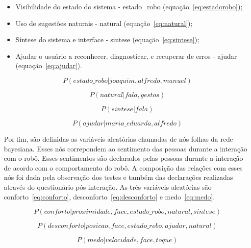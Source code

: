 \begin{itemize}
	\item Visibilidade do estado do sistema - estado\_robo (equação~\ref{eq:estadorobo});
	\item Uso de sugestões naturais - natural (equação~\ref{eq:natural});
	\item Síntese do sistema e interface - sintese (equação~\ref{eq:sintese});
	\item Ajudar o usuário a reconhecer, diagnosticar, e recuperar de erros - ajudar (equação~\ref{eq:ajudar}).
\end{itemize}

\begin{equation}
	\label{eq:estadorobo}
	P(estado\_robo | joaquim, alfredo, manuel)
\end{equation}

\begin{equation}
	\label{eq:natural}
	P(natural | fala, gestos)
\end{equation}

\begin{equation}
	\label{eq:sintese}
	P(sintese | fala)
\end{equation}

\begin{equation}
	\label{eq:ajudar}
	P(ajudar | maria\_eduarda, alfredo)
\end{equation}

Por fim, são definidas as variáveis aleatórias chamadas de nós folhas da rede bayesiana. Esses nós correpondem ao sentimento das pessoas durante a interação com o robô. Esses sentimentos são declarados pelas pessoas durante a interação de acordo com o comportamento do robô. A composição das relações com esses nós foi dada pela observação dos testes e também das declarações realizadas através do questionário pós interação. As três variáveis aleatórias são conforto~\ref{eq:conforto}, desconforto~\ref{eq:desconforto} e medo~\ref{eq:medo}.

\begin{equation}
	\label{eq:conforto}
	P(conforto | proximidade, face, estado\_robo, natural, sintese)
\end{equation}

\begin{equation}
	\label{eq:desconforto}
	P(desconforto | posicao, face, estado\_robo, ajudar, natural)
\end{equation}

\begin{equation}
	\label{eq:medo}
	P(medo | velocidade, face, toque)
\end{equation}

